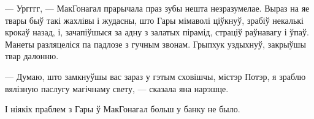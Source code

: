 --- Ургггг, --- МакГонагал прарычала праз зубы нешта незразумелае. Выраз на яе твары 
быў такі жахлівы і
жудасны, што Гары мімаволі ціўкнуў, зрабіў некалькі крокаў назад, і, зачапіўшыся за адну з
залатых пірамід, страціў раўнавагу і ўпаў. Манеты разляцеліся па падлозе з гучным звонам.
Грыпхук уздыхнуў, закрыўшы твар далонню.

--- Думаю, што замкнуўшы вас зараз у гэтым сховішчы, містэр Потэр, я
зраблю вялізную паслугу магічнаму свету, --- сказала яна нарэшце.

І ніякіх праблем з Гары ў МакГонагал больш у банку не было.

